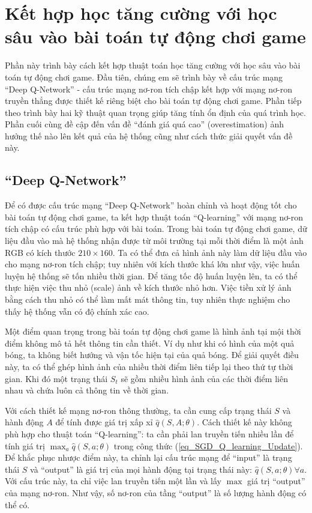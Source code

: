 \section{Kết hợp học tăng cường với học sâu vào bài toán tự động chơi game}
	Phần này trình bày cách kết hợp thuật toán học tăng cường với học sâu vào bài toán tự động chơi game.
	Đầu tiên, chúng em sẽ trình bày về cấu trúc mạng ``Deep Q-Network'' \cite{mnihdqn2015} - cấu trúc mạng nơ-ron tích chập kết hợp với mạng nơ-ron truyền thẳng được thiết kế riêng biệt cho bài toán tự động chơi game.
	Phần tiếp theo trình bày hai kỹ thuật quan trọng giúp tăng tính ổn định của quá trình học.
	Phần cuối cùng đề cập đến vấn đề ``đánh giá quá cao'' (overestimation) ảnh hưởng thế nào lên kết quả của hệ thống cũng như cách thức giải quyết vấn đề này.
	
\subsection{``Deep Q-Network''}
	Để có được cấu trúc mạng ``Deep Q-Network'' \cite{mnihdqn2015} hoàn chỉnh và hoạt động tốt cho bài toán tự động chơi game, ta kết hợp thuật toán ``Q-learning'' với mạng nơ-ron tích chập có cấu trúc phù hợp với bài toán.
	Trong bài toán tự động chơi game, dữ liệu đầu vào mà hệ thống nhận được từ môi trường tại mỗi thời điểm là một ảnh RGB có kích thước $210\times160$.
	Ta có thể đưa cả hình ảnh này làm dữ liệu đầu vào cho mạng nơ-ron tích chập; tuy nhiên với kích thước khá lớn như vậy, việc huấn luyện hệ thống sẽ tốn nhiều thời gian.
	Để tăng tốc độ huấn luyện lên, ta có thể thực hiện việc thu nhỏ (scale) ảnh về kích thước nhỏ hơn.
	Việc tiền xử lý ảnh bằng cách thu nhỏ có thể làm mất mát thông tin, tuy nhiên thực nghiệm cho thấy hệ thống vẫn có độ chính xác cao.
	
	Một điểm quan trọng trong bài toán tự động chơi game là hình ảnh tại mội thời điểm không mô tả hết thông tin cần thiết.
	Ví dụ như khi có hình của một quả bóng, ta không biết hướng và vận tốc hiện tại của quả bóng.
	Để giải quyết điều này, ta có thể ghép hình ảnh của nhiều thời điểm liên tiếp lại theo thứ tự thời gian.
	Khi đó một trạng thái $S_t$ sẽ gồm nhiều hình ảnh của các thời điểm liên nhau và chứa luôn cả thông tin về thời gian.
	
	Với cách thiết kế mạng nơ-ron thông thường, ta cần cung cấp trạng thái $S$ và hành động $A$ để tính được giá trị xấp xỉ $\hat{q}(S, A;\theta)$.
	Cách thiết kế này không phù hợp cho thuật toán ``Q-learning'': ta cần phải lan truyền tiến nhiều lần để tính giá trị $\max_{a}\hat{q}(S, a;\theta)$ trong công thức (\ref{eq_SGD_Q_learning_Update}).
	Để khắc phục nhược điểm này, ta chỉnh lại cấu trúc mạng để ``input'' là trạng thái $S$ và ``output'' là giá trị của mọi hành động tại trạng thái này: $\hat{q}(S, a;\theta) \forall a$.
	Với cấu trúc này, ta chỉ việc lan truyền tiến một lần và lấy $\max$ giá trị ``output'' của mạng nơ-ron.
	Như vậy, số nơ-ron của tầng ``output'' là số lượng hành động có thể có.
	
